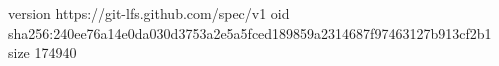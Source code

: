 version https://git-lfs.github.com/spec/v1
oid sha256:240ee76a14e0da030d3753a2e5a5fced189859a2314687f97463127b913cf2b1
size 174940
